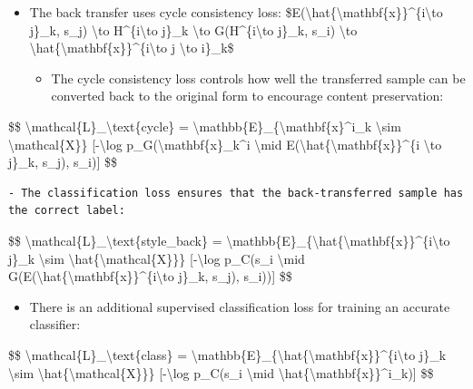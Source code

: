 \begin{itemize}
\tightlist
\item
  The back transfer uses cycle consistency loss: \$E(\textbackslash hat\{\textbackslash mathbf\{x\}\}\^{}\{i\textbackslash to j\}\_k, s\_j) \textbackslash to H\^{}\{i\textbackslash to j\}\_k \textbackslash to G(H\^{}\{i\textbackslash to j\}\_k, s\_i) \textbackslash to \textbackslash hat\{\textbackslash mathbf\{x\}\}\^{}\{i\textbackslash to j \textbackslash to i\}\_k\$

  \begin{itemize}
  \tightlist
  \item
    The cycle consistency loss controls how well the transferred sample can be converted back to the original form to encourage content preservation:
  \end{itemize}
\end{itemize}

\$\$ \textbackslash mathcal\{L\}\_\textbackslash text\{cycle\} = \textbackslash mathbb\{E\}\_\{\textbackslash mathbf\{x\}\^{}i\_k \textbackslash sim \textbackslash mathcal\{X\}\} {[}-\textbackslash log p\_G(\textbackslash mathbf\{x\}\_k\^{}i \textbackslash mid E(\textbackslash hat\{\textbackslash mathbf\{x\}\}\^{}\{i \textbackslash to j\}\_k, s\_j), s\_i){]} \$\$

\begin{verbatim}
- The classification loss ensures that the back-transferred sample has the correct label:
\end{verbatim}

\$\$ \textbackslash mathcal\{L\}\_\textbackslash text\{style\_back\} = \textbackslash mathbb\{E\}\_\{\textbackslash hat\{\textbackslash mathbf\{x\}\}\^{}\{i\textbackslash to j\}\_k \textbackslash sim \textbackslash hat\{\textbackslash mathcal\{X\}\}\} {[}-\textbackslash log p\_C(s\_i \textbackslash mid G(E(\textbackslash hat\{\textbackslash mathbf\{x\}\}\^{}\{i\textbackslash to j\}\_k, s\_j), s\_i)){]} \$\$

\begin{itemize}
\tightlist
\item
  There is an additional supervised classification loss for training an accurate classifier:
\end{itemize}

\$\$ \textbackslash mathcal\{L\}\_\textbackslash text\{class\} = \textbackslash mathbb\{E\}\_\{\textbackslash hat\{\textbackslash mathbf\{x\}\}\^{}\{i\textbackslash to j\}\_k \textbackslash sim \textbackslash hat\{\textbackslash mathcal\{X\}\}\} {[}-\textbackslash log p\_C(s\_i \textbackslash mid \textbackslash hat\{\textbackslash mathbf\{x\}\}\^{}i\_k){]} \$\$

